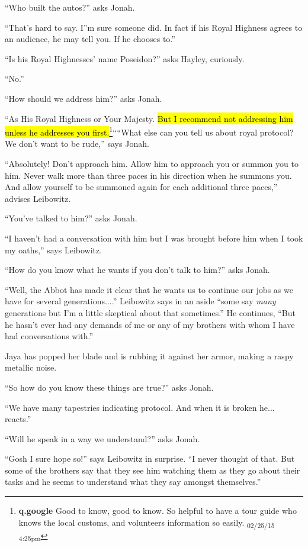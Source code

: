 ``Who built the autos?'' asks Jonah.

``That's hard to say.  I''m sure someone did.  In fact if his Royal Highness agrees to an audience, he may tell you.  If he chooses to.''

``Is his Royal Highnesses' name Poseidon?'' asks Hayley, curiously.

``No.''

``How should we address him?'' asks Jonah.

``As His Royal Highness or Your Majesty.  \hl{But I recommend not addressing him unless he addresses you first.}\footnote{\textbf{q.google }Good to know, good to know.  So helpful to have a tour guide who knows the local customs, and volunteers information so easily. \textsubscript{02/25/15 4:25pm}}````What else can you tell us about royal protocol?  We don't want to be rude,'' says Jonah.

``Absolutely!  Don't approach him.  Allow him to approach you or summon you to him.  Never walk more than three paces in his direction when he summons you.  And allow yourself to be summoned again for each additional three paces,'' advises Leibowitz.

``You've talked to him?'' asks Jonah.

``I haven't had a conversation with him but I was brought before him when I took my oaths,'' says Leibowitz.

``How do you know what he wants if you don't talk to him?'' asks Jonah.

``Well, the Abbot has made it clear that he wants us to continue our jobs as we have for several generations....'' Leibowitz says in an aside ``some say \textit{many} generations but I'm a little skeptical about that sometimes.''  He continues, ``But he hasn't ever had any demands of me or any of my brothers with whom I have had conversations with.''

Jaya has popped her blade and is rubbing it against her armor, making a raspy metallic noise.

``So how do you know these things are true?'' asks Jonah.

``We have many tapestries indicating protocol.  And when it is broken he... reacts.''

``Will he speak in a way we understand?'' asks Jonah.

``Gosh I sure hope so!'' says Leibowitz in surprise.  ``I never thought of that. But some of the brothers say that they see him watching them as they go about their tasks and he seems to understand what they say amongst themselves.''


